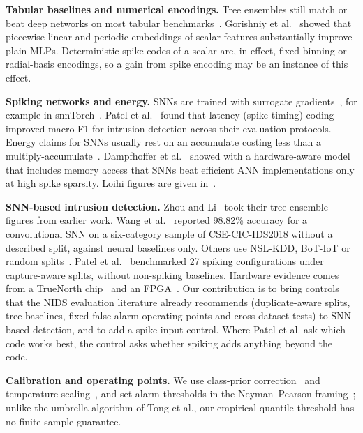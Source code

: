 \documentclass[conference]{IEEEtran}
\begin{document}
\textbf{Tabular baselines and numerical encodings.} Tree ensembles still match or beat deep networks on most tabular benchmarks~\cite{grinsztajn2022,shwartzziv2022}. Gorishniy et al.~\cite{gorishniy2022} showed that piecewise-linear and periodic embeddings of scalar features substantially improve plain MLPs. Deterministic spike codes of a scalar are, in effect, fixed binning or radial-basis encodings, so a gain from spike encoding may be an instance of this effect.

\textbf{Spiking networks and energy.} SNNs are trained with surrogate gradients~\cite{neftci2019}, for example in snnTorch~\cite{eshraghian2023}. Patel et al.~\cite{patel2026spiketiming} found that latency (spike-timing) coding improved macro-F1 for intrusion detection across their evaluation protocols. Energy claims for SNNs usually rest on an accumulate costing less than a multiply-accumulate~\cite{horowitz2014}. Dampfhoffer et al.~\cite{dampfhoffer2023} showed with a hardware-aware model that includes memory access that SNNs beat efficient ANN implementations only at high spike sparsity. Loihi figures are given in~\cite{davies2018,davies2021}.

\textbf{SNN-based intrusion detection.} Zhou and Li~\cite{zhou2021singlespike} took their tree-ensemble figures from earlier work. Wang et al.~\cite{wang2024convsnn} reported 98.82\% accuracy for a convolutional SNN on a six-category sample of CSE-CIC-IDS2018 without a described split, against neural baselines only. Others use NSL-KDD, BoT-IoT or random splits~\cite{zivadinovic2024resource,fesu2025comparative,karthik2026hybrid}. Patel et al.~\cite{patel2026spiketiming} benchmarked 27 spiking configurations under capture-aware splits, without non-spiking baselines. Hardware evidence comes from a TrueNorth chip~\cite{alom2017truenorth} and an FPGA~\cite{mehrabi2024industrial}. Our contribution is to bring controls that the NIDS evaluation literature already recommends (duplicate-aware splits, tree baselines, fixed false-alarm operating points and cross-dataset tests) to SNN-based detection, and to add a spike-input control. Where Patel et al. ask which code works best, the control asks whether spiking adds anything beyond the code.

\textbf{Calibration and operating points.} We use class-prior correction~\cite{saerens2002} and temperature scaling~\cite{guo2017}, and set alarm thresholds in the Neyman--Pearson framing~\cite{tong2018}; unlike the umbrella algorithm of Tong et al., our empirical-quantile threshold has no finite-sample guarantee.
\end{document}
